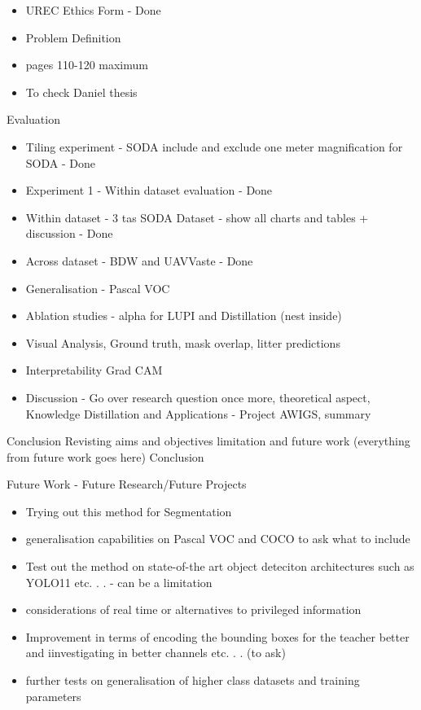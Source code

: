 
\begin{itemize}
    \item UREC Ethics Form - Done
    \item Problem Definition
    \item pages 110-120 maximum
    \item To check Daniel thesis
\end{itemize}

Evaluation
\begin{itemize}
    \item Tiling experiment - SODA include and exclude one meter magnification for SODA - Done

    \item Experiment 1 - Within dataset evaluation - Done
    \item Within dataset - 3 tas SODA Dataset - show all charts and tables + discussion - Done
    \item Across dataset - BDW and UAVVaste - Done
    \item Generalisation - Pascal VOC
    \item Ablation studies - alpha for LUPI and Distillation (nest inside)
    \item Visual Analysis, Ground truth, mask overlap, litter predictions
    \item Interpretability Grad CAM
    \item Discussion - Go over research question once more, theoretical aspect, Knowledge Distillation and Applications - Project AWIGS, summary
\end{itemize}

Conclusion
Revisting aims and objectives
limitation and future work (everything from future work goes here)
Conclusion

Future Work - Future Research/Future Projects
\begin{itemize}
    \item Trying out this method for Segmentation
    \item generalisation capabilities on Pascal VOC and COCO to ask what to include
    \item Test out the method on state-of-the art object deteciton architectures such as YOLO11 etc. . . - can be a limitation
    \item considerations of real time or alternatives to privileged information
    \item Improvement in terms of encoding the bounding boxes for the teacher better and iinvestigating in better channels etc. . . (to ask)
    \item further tests on generalisation of higher class datasets and training parameters
\end{itemize}

